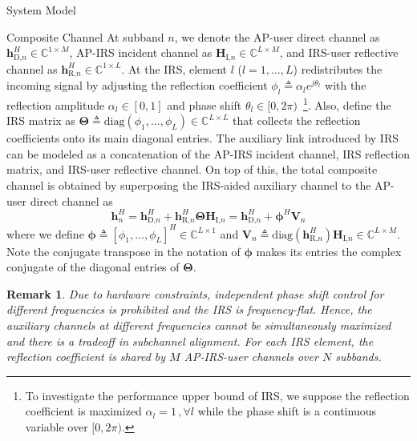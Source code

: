\documentclass[journal]{IEEEtran}
\newtheorem{remark}{Remark}
\begin{document}
\begin{section}{System Model}
		\begin{subsection}{Composite Channel}
			At subband $n$, we denote the AP-user direct channel as $\boldsymbol{h}_{\text{D,}n}^H \in \mathbb{C}^{1 \times M}$, AP-IRS incident channel as $\boldsymbol{H}_{\text{I,}n} \in \mathbb{C}^{L \times M}$, and IRS-user reflective channel as $\boldsymbol{h}_{\text{R,}n}^H \in \mathbb{C}^{1 \times L}$. At the IRS, element $l$ ($l=1,\dots,L$) redistributes the incoming signal by adjusting the reflection coefficient $\phi_l \triangleq \alpha_l e^{j\theta_l}$ with the reflection amplitude $\alpha_l \in [0,1]$ and phase shift $\theta_l \in [0,2\pi)$~\footnote{To investigate the performance upper bound of IRS, we suppose the reflection coefficient is maximized $\alpha_l=1\,,\forall l$ while the phase shift is a continuous variable over $[0,2\pi)$.}. Also, define the IRS matrix as $\boldsymbol{\Theta} \triangleq \mathrm{diag}(\phi_1, \dots, \phi_L) \in \mathbb{C}^{L \times L}$ that collects the reflection coefficients onto its main diagonal entries. The auxiliary link introduced by IRS can be modeled as a concatenation of the AP-IRS incident channel, IRS reflection matrix, and IRS-user reflective channel. On top of this, the total composite channel is obtained by superposing the IRS-aided auxiliary channel to the AP-user direct channel as
			\begin{equation}\label{eq:h_n}
				\boldsymbol{h}_{n}^H = \boldsymbol{h}_{\text{D,}n}^H + \boldsymbol{h}_{\text{R,}n}^H \boldsymbol{\Theta} \boldsymbol{H}_{\text{I,}n} = \boldsymbol{h}_{\text{D,}n}^H + \boldsymbol{\phi}^H \boldsymbol{V}_{n}
			\end{equation}
			where we define $\boldsymbol{\phi} \triangleq [\phi_1, \dots, \phi_L]^H \in \mathbb{C}^{L \times 1}$ and $\boldsymbol{V}_{n} \triangleq \mathrm{diag}(\boldsymbol{h}_{\text{R,}n}^H)\boldsymbol{H}_{\text{I,}n} \in \mathbb{C}^{L \times M}$. Note the conjugate transpose in the notation of $\boldsymbol{\phi}$ makes its entries the complex conjugate of the diagonal entries of $\boldsymbol{\Theta}$.
			\begin{remark}\label{re:irs_frequency_flat}
				Due to hardware constraints, independent phase shift control for different frequencies is prohibited and the IRS is frequency-flat. Hence, the auxiliary channels at different frequencies cannot be simultaneously maximized and there is a tradeoff in subchannel alignment. For each IRS element, the reflection coefficient is shared by $M$ AP-IRS-user channels over $N$ subbands.
			\end{remark}
		\end{subsection}



\end{section}
\end{document}
